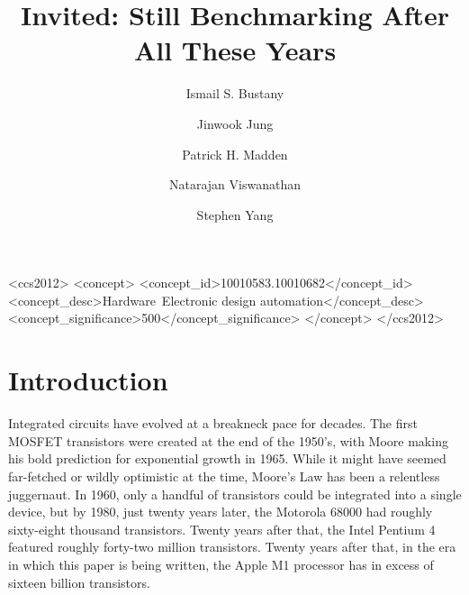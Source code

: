\documentclass[sigconf]{acmart}
\begin{document}
\title{Invited: Still Benchmarking After All These Years}
\iffalse
\author{Blind Review}
\else
\author{Ismail S. Bustany}
\author{Jinwook Jung}
\author{Patrick H. Madden}
\author{Natarajan Viswanathan}
\author{Stephen Yang}


 
\fi
\begin{abstract}

\end{abstract}

\begin{CCSXML}
<ccs2012>
   <concept>
       <concept_id>10010583.10010682</concept_id>
       <concept_desc>Hardware~Electronic design automation</concept_desc>
       <concept_significance>500</concept_significance>
       </concept>
 </ccs2012>
\end{CCSXML}



%


\maketitle

\section{Introduction}

Integrated circuits have evolved at a breakneck pace for decades.  The
first MOSFET transistors were created at the end of the 1950's, with
Moore\cite{Moore650114} making his bold prediction for exponential
growth in 1965.  While it might have seemed far-fetched or wildly
optimistic at the time, Moore's Law has been a relentless juggernaut.
In 1960, only a handful of transistors could be integrated into a
single device, but by 1980, just twenty years later, the Motorola
68000 had roughly sixty-eight thousand transistors.  Twenty years
after that, the Intel Pentium 4 featured roughly forty-two million
transistors.  Twenty years after that, in the era in which this paper
is being written, the Apple M1 processor has in excess of sixteen
billion transistors.
\end{document}
